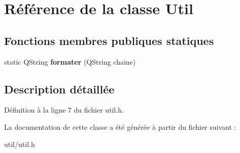 \hypertarget{class_util}{
\section{Référence de la classe Util}
\label{d1/d0a/class_util}
}
\subsection*{Fonctions membres publiques statiques}
\begin{DoxyCompactItemize}
\item 
\hypertarget{class_util_aa31b577b6cf24eb02bc901380159f979}{
static QString {\bfseries formater} (QString chaine)}
\label{d1/d0a/class_util_aa31b577b6cf24eb02bc901380159f979}

\end{DoxyCompactItemize}


\subsection{Description détaillée}


Définition à la ligne 7 du fichier util.h.



La documentation de cette classe a été générée à partir du fichier suivant :\begin{DoxyCompactItemize}
\item 
util/util.h\end{DoxyCompactItemize}
